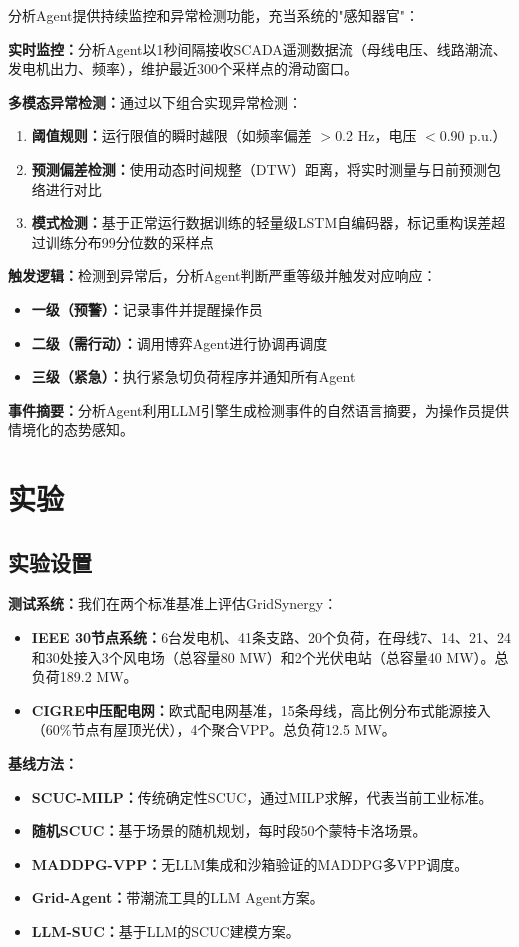 \documentclass[conference]{IEEEtran}
\begin{document}
分析Agent提供持续监控和异常检测功能，充当系统的"感知器官"：

\textbf{实时监控：}分析Agent以1秒间隔接收SCADA遥测数据流（母线电压、线路潮流、发电机出力、频率），维护最近300个采样点的滑动窗口。

\textbf{多模态异常检测：}通过以下组合实现异常检测：
\begin{enumerate}
    \item \textbf{阈值规则：}运行限值的瞬时越限（如频率偏差 $>$0.2 Hz，电压 $<$0.90 p.u.）
    \item \textbf{预测偏差检测：}使用动态时间规整（DTW）距离，将实时测量与日前预测包络进行对比
    \item \textbf{模式检测：}基于正常运行数据训练的轻量级LSTM自编码器，标记重构误差超过训练分布99分位数的采样点
\end{enumerate}

\textbf{触发逻辑：}检测到异常后，分析Agent判断严重等级并触发对应响应：
\begin{itemize}
    \item \textbf{一级（预警）：}记录事件并提醒操作员
    \item \textbf{二级（需行动）：}调用博弈Agent进行协调再调度
    \item \textbf{三级（紧急）：}执行紧急切负荷程序并通知所有Agent
\end{itemize}

\textbf{事件摘要：}分析Agent利用LLM引擎生成检测事件的自然语言摘要，为操作员提供情境化的态势感知。

\section{实验}

\subsection{实验设置}

\textbf{测试系统：}我们在两个标准基准上评估GridSynergy：
\begin{itemize}
    \item \textbf{IEEE 30节点系统：}6台发电机、41条支路、20个负荷，在母线7、14、21、24和30处接入3个风电场（总容量80 MW）和2个光伏电站（总容量40 MW）。总负荷189.2 MW。
    \item \textbf{CIGRE中压配电网：}欧式配电网基准，15条母线，高比例分布式能源接入（60\%节点有屋顶光伏），4个聚合VPP。总负荷12.5 MW。
\end{itemize}

\textbf{基线方法：}
\begin{itemize}
    \item \textbf{SCUC-MILP：}传统确定性SCUC，通过MILP求解，代表当前工业标准。
    \item \textbf{随机SCUC：}基于场景的随机规划，每时段50个蒙特卡洛场景。
    \item \textbf{MADDPG-VPP：}无LLM集成和沙箱验证的MADDPG多VPP调度\cite{madrl_vpp_2026}。
    \item \textbf{Grid-Agent：}带潮流工具的LLM Agent方案\cite{grid_agent_2025}。
    \item \textbf{LLM-SUC：}基于LLM的SCUC建模方案\cite{llm_suc_2025}。
\end{itemize}
\end{document}
